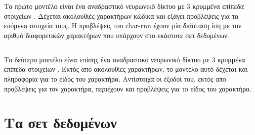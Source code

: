 Το πρώτο μοντέλο είναι ένα αναδραστικό νευρωνικό δίκτυο με 3 κρυμμένα επίπεδα στοιχείων .
Δέχεται ακολουθιές χαρακτήρων κώδικα και εξάγει προβλέψεις για τα επόμενα στοιχεία τους.
Η προβλέψεις του char-rnn έχουν μία διάσταση ίση με τον αριθμό διαφορετικών χαρακτήρων που υπάρχουν στο εκάστοτε σετ δεδομένων.   

\subsection{}

Το δεύτερο μοντέλο είναι επίσης ένα αναδραστικό νευρωνικό δίκτυο με 3 κρυμμένα επίπεδα στοιχείων . 
Εκτός απο ακολουθίες χαρακτήρων, το μοντέλο αυτό δέχεται και πληροφορία για το είδος του χαρακτήρα. 
Αντίστοιχα οι έξοδοί του, εκτός απο προβλέψεις για τον χαρακτήρα, περιέχουν και προβλέψεις για το είδος του χαρακτήρα.

\section{Τα σετ δεδομένων}

\section{}

\section{}

\section{}
